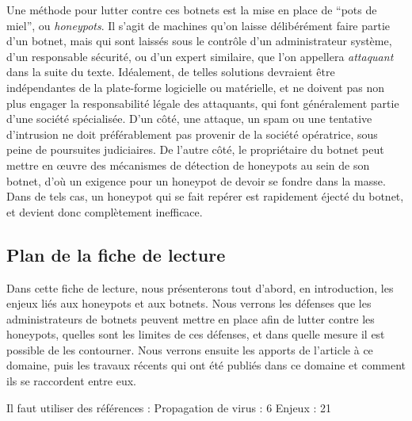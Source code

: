 Une méthode pour lutter contre ces botnets est la mise en place de ``pots de
miel'', ou \textit{honeypots}.  Il s'agit de machines qu'on laisse délibérément
faire partie d'un botnet, mais qui sont laissés sous le contrôle d'un
administrateur système, d'un responsable sécurité, ou d'un expert similaire,
que l'on appellera \textit{attaquant} dans la suite du texte.  Idéalement, de
telles solutions devraient être indépendantes de la plate-forme logicielle ou
matérielle, et ne doivent pas non plus engager la responsabilité légale des
attaquants, qui font généralement partie d'une société spécialisée.  D'un côté,
une attaque, un spam ou une tentative d'intrusion ne doit préférablement pas
provenir de la société opératrice, sous peine de poursuites judiciaires. De
l'autre côté, le propriétaire du botnet peut mettre en œuvre des mécanismes de
détection de honeypots au sein de son botnet, d'où un exigence pour un honeypot
de devoir se fondre dans la masse.  Dans de tels cas, un honeypot qui se fait
repérer est rapidement éjecté du botnet, et devient donc complètement
inefficace.

\subsection{Plan de la fiche de lecture}

Dans cette fiche de lecture, nous présenterons tout d'abord, en introduction,
les enjeux liés aux honeypots et aux botnets. Nous verrons les défenses que les
administrateurs de botnets peuvent mettre en place afin de lutter contre les
honeypots, quelles sont les limites de ces défenses, et dans quelle mesure il
est possible de les contourner. Nous verrons ensuite les apports de l'article à
ce domaine, puis les travaux récents qui ont été publiés dans ce domaine et
comment ils se raccordent entre eux.


Il faut utiliser des références :
Propagation de virus : 6
Enjeux : 21
